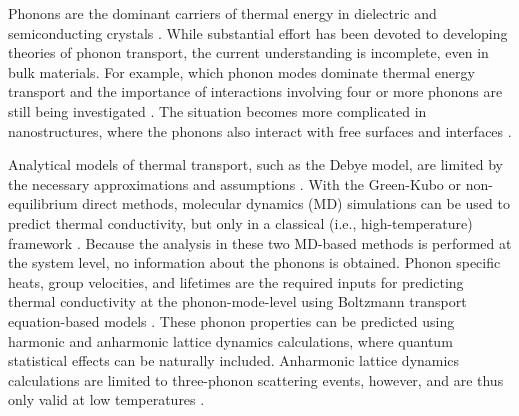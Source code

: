 \documentclass[12pt,twocolumn,iop]{/usr/share/texmf-texlive/tex/latex/iop/iopart}[/usr/share/texmf-texlive/tex/latex/iop/]
\begin{document}
Phonons are the dominant carriers of thermal energy in dielectric
and semiconducting crystals \cite{cahill2003,goodson2005,srivastava1990,wallace1972,maradudin1974,dove1993}. While
substantial effort has been devoted to developing theories of phonon
transport, the current understanding is incomplete, even in bulk materials. For
example, which phonon modes dominate thermal energy transport and the importance of
interactions involving four or more phonons are still being investigated \cite{wallace1972,srivastava1990,broido2007,esfarjani2011,cahill2003}.  The
situation becomes more complicated in nanostructures, where the phonons also interact with free surfaces and interfaces \cite{asheghi1997,balandin1997,li1997,tian2011,Hochbaum2011,Martin2011,Yu2011,Hopkins2011,landry2008,mcgaughey2011a,landry2009,landry2009b,landry2010}.

Analytical models of thermal transport, such as the Debye model, are limited by
the necessary approximations and assumptions \cite{callaway1959,holland1963,mcgaughey2011a}. With the Green-Kubo or
non-equilibrium direct methods, molecular dynamics (MD) simulations can be used to predict thermal
conductivity, but only in a classical (i.e., high-temperature) framework \cite{ladd1986,mcgaughey2004c,landry2008,schelling2002,sellan2010a,esfarjani2011,turney2009a}. Because the analysis in these two MD-based methods is performed at the system level, no information about the phonons is obtained. Phonon specific heats, group velocities, and lifetimes are the required inputs for predicting thermal conductivity at the phonon-mode-level using  Boltzmann transport equation-based models \cite{ladd1986,mcgaughey2004c,mcgaughey2011a,sellan2010b,esfarjani2011,turney2009a,He2011}.
These phonon properties can be predicted using harmonic and anharmonic lattice dynamics
calculations,\cite{maradudin1962,wallace1972,ladd1986,dove1993,turney2009a,turney2009b} where quantum statistical effects can be naturally included. Anharmonic lattice dynamics calculations are limited to three-phonon scattering events, however, and are thus only valid at low temperatures \cite{turney2009a,esfarjani2011,wallace1972,srivastava1990}.
\end{document}
